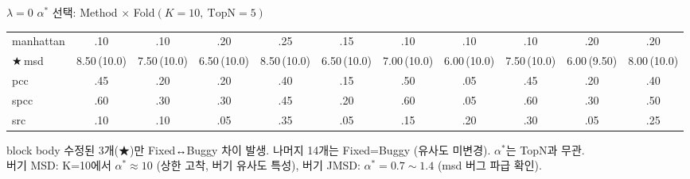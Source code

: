 \documentclass[aspectratio=169,10pt]{beamer}
\begin{document}
\begin{frame}[shrink=20]{$\lambda=0$\; $\alpha^*$ 선택: Method $\times$ Fold\quad $(K=10,\ \mathrm{TopN}=5)$}
\begin{tabular}{@{}l@{\quad}c@{\quad}c@{\quad}c@{\quad}c@{\quad}c@{\quad}c@{\quad}c@{\quad}c@{\quad}c@{\quad}c@{}}
		manhattan  & .10 & .10 & .20 & .25 & .15 & .10 & .10 & .10 & .20 & .20 \\
		\rowcolor{posblue!18}
		{\color{posblue}★}\,msd  & 8.50\,{\color{negred}(10.0)} & 7.50\,{\color{negred}(10.0)} & 6.50\,{\color{negred}(10.0)} & 8.50\,{\color{negred}(10.0)} & 6.50\,{\color{negred}(10.0)} & 7.00\,{\color{negred}(10.0)} & 6.00\,{\color{negred}(10.0)} & 7.50\,{\color{negred}(10.0)} & 6.00\,{\color{negred}(9.50)} & 8.00\,{\color{negred}(10.0)} \\
		pcc        & .45 & .20 & .20 & .40 & .15 & .50 & .05 & .45 & .20 & .40 \\
		spcc       & .60 & .30 & .30 & .45 & .20 & .60 & .05 & .60 & .30 & .50 \\
		src        & .10 & .10 & .05 & .35 & .05 & .15 & .20 & .30 & .05 & .25 \\
		\bottomrule
	\end{tabular}

	\vspace{0.4em}
	\begin{beamercolorbox}[rounded=true,shadow=false,wd=\linewidth]{block body}
		\small 수정된 3개(★)만 Fixed↔Buggy 차이 발생. 나머지 14개는 Fixed=Buggy (유사도 미변경). $\alpha^*$는 TopN과 무관.\\
		버기 MSD: K=10에서 $\alpha^*\approx10$ (상한 고착, 버기 유사도 특성), 버기 JMSD: $\alpha^*=0.7\sim1.4$ (msd 버그 파급 확인).
	\end{beamercolorbox}
\end{frame}
\end{document}
